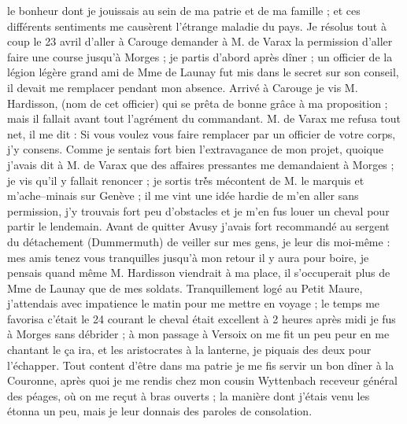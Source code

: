 \documentclass[12pt]{article}
\begin{document}
 le bonheur dont je jouissais au sein de ma patrie et de
ma famille ; et ces différents sentiments me causèrent l’étrange maladie du pays. Je résolus tout à
coup le 23 avril d’aller à Carouge demander à M. de Varax la permission d’aller faire une course
jusqu’à Morges ; je partis d’abord après dîner ; un officier de la légion légère grand ami de Mme de
Launay fut mis dans le secret sur son conseil, il devait me remplacer pendant mon absence. Arrivé à
Carouge je vis M. Hardisson, (nom de cet officier) qui se prêta de bonne grâce à ma proposition ;
mais il fallait avant tout l’agrément du commandant. M. de Varax me refusa tout net, il me dit : Si
vous voulez vous faire remplacer par un officier de votre corps, j’y consens. Comme je sentais fort
bien l’extravagance de mon projet, quoique j’avais dit à M. de Varax que des affaires pressantes me
demandaient à Morges ; je vis qu’il y fallait renoncer ; je sortis trè́s mécontent de M. le marquis
et m’ache–minais sur Genève ; il me vint une idée hardie de m’en aller sans permission, j’y trouvais
fort peu d’obstacles et je m’en fus louer un cheval pour partir le lendemain. Avant de quitter Avusy
j’avais fort recommandé au sergent du détachement (Dummermuth) de veiller sur mes gens, je leur dis
moi-même : mes amis tenez vous tranquilles jusqu’à mon retour il y aura pour boire, je pensais quand
même M. Hardisson viendrait à ma place, il s’occuperait plus de Mme de Launay que de mes soldats.
Tranquillement logé au Petit Maure, j’attendais avec impatience le matin pour me mettre en voyage ;
le temps me favorisa c’était le 24 courant le cheval était excellent à 2 heures après midi je fus à
Morges sans débrider ; à mon passage à Versoix on me fit un peu peur en me chantant le ça ira, et
les aristocrates à la lanterne, je piquais des deux pour l’échapper. Tout content d’être dans ma
patrie je me fis servir un bon dîner à la Couronne, après quoi je me rendis chez mon cousin
Wyttenbach receveur général des péages, où on me reçut à bras ouverts ; la manière dont j’étais venu
les étonna un peu, mais je leur donnais des paroles de consolation.
\end{document}
